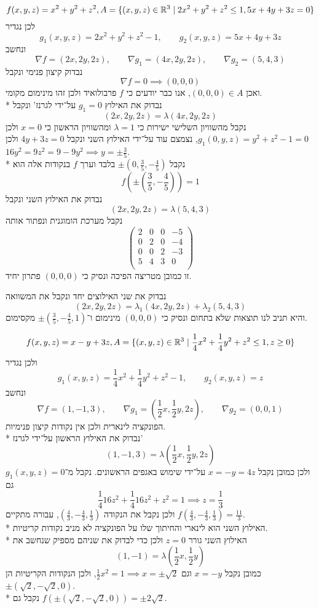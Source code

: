 \Subquestion{}
\[
	f(x, y, z) = x^2 + y^2 + z^2, A = \{ (x, y, z) \in \mathbb{R}^3 \mid 2x^2 + y^2 + z^2 \le 1, 5x + 4y + 3z = 0 \}
\]
לכן נגדיר
\[
	g_1(x, y, z) = 2x^2 + y^2 + z^2 - 1,
	\qquad
	g_2(x, y, z) = 5x + 4y + 3z
\]
ונחשב
\[
	\nabla f = (2x, 2y, 2z),
	\qquad
	\nabla g_1 = (4x, 2y, 2z),
	\qquad
	\nabla g_2 = (5, 4, 3)
\]
נבדוק קיצון פנימי ונקבל
\[
	\nabla f = 0 \implies (0, 0, 0)
\]
ואכן $(0, 0, 0) \in A$, אנו כבר יודעים כי $f$ פרבולואיד ולכן זהו מינימום מקומי. \\*
נבדוק את האילוץ $g_1 = 0$ על־ידי לגרנז' ונקבל
\[
	(2x, 2y, 2z) = \lambda (4x, 2y, 2z)
\]
נקבל מהשוויון השלישי ישירות כי $\lambda = 1$ ומהשוויון הראשון כי $x = 0$ ולכן $g_1(0, y, z) = y^2 + z^2 - 1 = 0$, נצמצם עוד על־ידי האילוץ השני ונקבל $4y + 3z = 0$ ולכן $16y^2 = 9z^2 = 9 - 9y^2 \implies y = \pm \frac{3}{5}$. \\*
נקבל $\pm(0, \frac{3}{5}, -\frac{4}{5})$ בלבד וערך $f$ בנקודות אלה הוא
\[
	f(\pm(\frac{3}{5}, -\frac{4}{5})) = 1
\]
נבדוק את האילוץ השני ונקבל
\[
	(2x, 2y, 2z) = \lambda (5, 4, 3)
\]
נקבל מערכת הומוגנית ונפתור אותה
\[
	\begin{pmatrix}
		2 & 0 & 0 & -5 \\
		0 & 2 & 0 & -4 \\
		0 & 0 & 2 & -3 \\
		5 & 4 & 3 & 0 \\
	\end{pmatrix}
\]
זו כמובן מטריצה הפיכה ונסיק כי $(0, 0, 0)$ פתרון יחיד.

נבדוק את שני האילוצים יחד ונקבל את המשוואה
\[
	(2x, 2y, 2z) = \lambda_1 (4x, 2y, 2z) + \lambda_2 (5, 4, 3)
\]
והיא תניב לנו תוצאות שלא בתחום ונסיק כי $(0, 0, 0)$ מינימום ו־$\pm(\frac{3}{5}, -\frac{4}{5}, 1)$ מקסימום.

\Subquestion{}
\[
	f(x, y, z) = x - y + 3z, A = \{(x, y, z) \in \mathbb{R}^3 \mid \frac{1}{4}x^2 + \frac{1}{4}y^2 + z^2 \le 1, z \ge 0 \}
\]
ולכן נגדיר
\[
	g_1(x, y, z) = \frac{1}{4}x^2 + \frac{1}{4}y^2 + z^2 - 1,
	\qquad
	g_2(x, y, z) = z
\]
ונחשב
\[
	\nabla f = (1, -1, 3),
	\qquad
	\nabla g_1 = (\frac{1}{2}x, \frac{1}{2}y, 2z),
	\qquad
	\nabla g_2 = (0, 0, 1)
\]
הפונקציה לינארית ולכן אין נקודות קיצון פנימיות. \\*
נבדוק את האילוץ הראשון על־ידי לגרנז'
\[
	(1, -1, 3) = \lambda (\frac{1}{2}x, \frac{1}{2}y, 2z)
\]
ולכן כמובן נקבל $x = -y = 4z$ על־ידי שימוש באגפים הראשונים. נקבל מ־$g_1(x, y, z) = 0$ גם
\[
	\frac{1}{4} 16z^2 + \frac{1}{4} 16z^2 + z^2 = 1 \implies z = \frac{1}{3}
\]
ולכן נקבל את הנקודה $(\frac{4}{3}, -\frac{4}{3}, \frac{1}{3})$, עבורה מתקיים $f(\frac{4}{3}, -\frac{4}{3}, \frac{1}{3}) = \frac{11}{3}$. \\*
האילוץ השני הוא לינארי והחיתוך שלו על הפונקציה לא מניב נקודות קריטיות. \\*
האילוץ השני גורר $z = 0$ ולכן כדי לבדוק את שניהם מספיק שנחשב את
\[
	(1, -1) = \lambda (\frac{1}{2} x, \frac{1}{2} y)
\]
כמובן נקבל $x = -y$ וגם $\frac{1}{2} x^2 = 1 \implies x = \pm \sqrt{2}$, ולכן הנקודות הקריטיות הן $\pm(\sqrt{2}, -\sqrt{2}, 0)$. \\*
נקבל גם $f(\pm(\sqrt{2}, -\sqrt{2}, 0)) = \pm 2 \sqrt{2}$.

